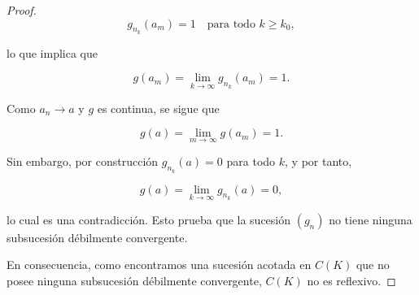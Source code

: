 \begin{proof}
\[
g_{n_k}(a_m) = 1 \quad \text{para todo } k \geq k_0,
\]

lo que implica que

\[
g(a_m) = \lim_{k \to \infty} g_{n_k}(a_m) = 1.
\]

Como $a_n \to a$ y $g$ es continua, se sigue que

\[
g(a) = \lim_{m \to \infty} g(a_m) = 1.
\]

Sin embargo, por construcción $g_{n_k}(a) = 0$ para todo $k$, y por tanto,

\[
g(a) = \lim_{k \to \infty} g_{n_k}(a) = 0,
\]

lo cual es una contradicción. Esto prueba que la sucesión $(g_n)$ no tiene ninguna subsucesión débilmente convergente.

En consecuencia, como encontramos una sucesión acotada en \( C(K) \) que no posee ninguna subsucesión débilmente convergente, \( C(K) \) no es reflexivo.

\end{proof}
